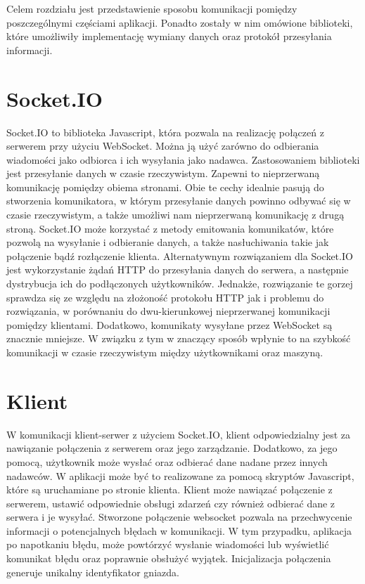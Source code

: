 Celem rozdziału jest przedstawienie sposobu komunikacji pomiędzy poszczególnymi częściami aplikacji. Ponadto zostały w nim omówione biblioteki, które umożliwiły implementację wymiany danych oraz protokół przesyłania informacji.
\section{Socket.IO}
Socket.IO to biblioteka Javascript, która pozwala na realizację połączeń z serwerem przy użyciu WebSocket. Można ją użyć zarówno do odbierania wiadomości jako odbiorca i ich wysyłania jako nadawca. Zastosowaniem biblioteki jest przesyłanie danych w czasie rzeczywistym. Zapewni to nieprzerwaną komunikację pomiędzy obiema stronami. Obie te cechy idealnie pasują do stworzenia komunikatora, w którym przesyłanie danych powinno odbywać się w czasie rzeczywistym, a także umożliwi nam nieprzerwaną komunikację z drugą stroną. Socket.IO może korzystać z metody emitowania komunikatów, które pozwolą na wysyłanie i odbieranie danych, a także nasłuchiwania takie jak połączenie bądź rozłączenie klienta. Alternatywnym rozwiązaniem dla Socket.IO jest wykorzystanie żądań HTTP do przesyłania danych do serwera, a następnie dystrybucja ich do podłączonych użytkowników. Jednakże, rozwiązanie te gorzej sprawdza się ze względu na złożoność protokołu HTTP jak i problemu do rozwiązania, w porównaniu do dwu-kierunkowej nieprzerwanej komunikacji pomiędzy klientami. Dodatkowo, komunikaty wysyłane przez WebSocket są znacznie mniejsze. W związku z tym w znaczący sposób wpłynie to na szybkość komunikacji w czasie rzeczywistym między użytkownikami oraz maszyną.

\section{Klient}W komunikacji klient-serwer z użyciem Socket.IO, klient odpowiedzialny jest za nawiązanie połączenia z serwerem oraz jego zarządzanie. Dodatkowo, za jego pomocą, użytkownik może wysłać oraz odbierać dane nadane przez innych nadawców. W aplikacji może być to realizowane za pomocą skryptów Javascript, które są uruchamiane po stronie klienta. Klient może nawiązać połączenie z serwerem, ustawić odpowiednie obsługi zdarzeń czy również odbierać dane z serwera i je wysyłać. Stworzone połączenie websocket pozwala na przechwycenie informacji o potencjalnych błędach w komunikacji. W tym przypadku, aplikacja po napotkaniu błędu, może powtórzyć wysłanie wiadomości lub wyświetlić komunikat błędu oraz poprawnie obsłużyć wyjątek. Inicjalizacja połączenia generuje unikalny identyfikator gniazda.

